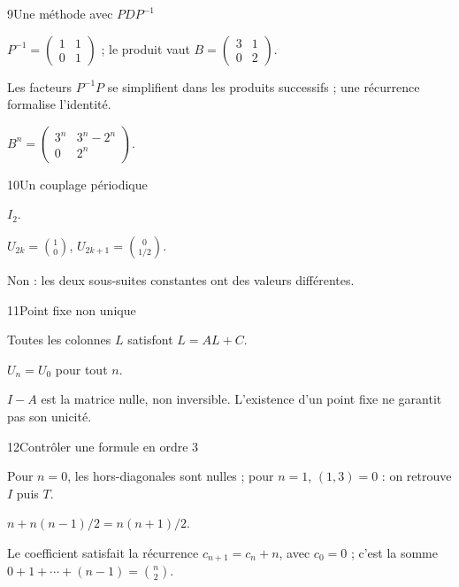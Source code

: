 \begin{corrige}{9}{Une méthode avec $PDP^{-1}$}
\begin{questions}
\item $P^{-1}=\begin{pmatrix}1&1\\0&1\end{pmatrix}$ ; le produit vaut $B=\begin{pmatrix}3&1\\0&2\end{pmatrix}$.
\item Les facteurs $P^{-1}P$ se simplifient dans les produits successifs ; une récurrence formalise l’identité.
\item $B^n=\begin{pmatrix}3^n&3^n-2^n\\0&2^n\end{pmatrix}$.
\end{questions}
\end{corrige}
\begin{corrige}{10}{Un couplage périodique}
\begin{questions}
\item $I_2$.
\item $U_{2k}=\binom10$, $U_{2k+1}=\binom0{1/2}$.
\item Non : les deux sous-suites constantes ont des valeurs différentes.
\end{questions}
\end{corrige}
\par\begingroup\renewcommand{\otBesoinPlace}[1]{}\noindent\begin{minipage}{\linewidth}
\begin{corrige}{11}{Point fixe non unique}
\begin{questions}
\item Toutes les colonnes $L$ satisfont $L=AL+C$.
\item $U_n=U_0$ pour tout $n$.
\item $I-A$ est la matrice nulle, non inversible. L’existence d’un point fixe ne garantit pas son unicité.
\end{questions}
\end{corrige}
\begin{corrige}{12}{Contrôler une formule en ordre $3$}
\begin{questions}
\item Pour $n=0$, les hors-diagonales sont nulles ; pour $n=1$, $(1,3)=0$ : on retrouve $I$ puis $T$.
\item $n+n(n-1)/2=n(n+1)/2$.
\item Le coefficient satisfait la récurrence $c_{n+1}=c_n+n$, avec $c_0=0$ ; c’est la somme $0+1+\cdots+(n-1)=\binom n2$.
\end{questions}
\end{corrige}
\end{minipage}\endgroup
